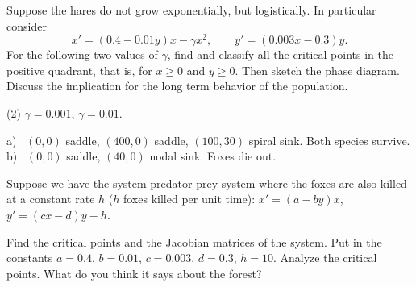\begin{exercise}
Suppose the hares do not grow exponentially, but logistically.  In
particular consider
\begin{equation*}
x' = (0.4-0.01y)x - \gamma x^2, \qquad y' = (0.003x-0.3)y .
\end{equation*}
For the following two values of $\gamma$,
find and classify all the critical points in the positive quadrant, that is, for
$x \geq 0$ and $y \geq 0$.  Then sketch the phase diagram.  Discuss the
implication for the long term behavior of the population.
\begin{tasks}(2)
\task
$\gamma=0.001$, 
\task
$\gamma=0.01$.
\end{tasks}
\end{exercise}
\comboSol{%
}
{%
a)~ $(0,0)$ saddle, $(400, 0)$ saddle, $(100, 30)$ spiral sink. Both species survive. \quad b)~ $(0,0)$ saddle, $(40,0)$ nodal sink. Foxes die out.
}

\begin{exercise}\ansMark%
Suppose we have the system predator-prey system where the foxes are also
killed at a constant rate $h$ ($h$ foxes killed per unit time):
$x' = (a-by)x,$  $y' = (cx-d)y - h$.
\begin{tasks}
\task Find the critical points and the
Jacobian matrices of the system.
\task Put in the constants $a=0.4$, $b=0.01$, $c=0.003$, $d=0.3$, $h=10$.
Analyze the critical points.  What do you think it says about the forest?
\end{tasks}
\end{exercise}

